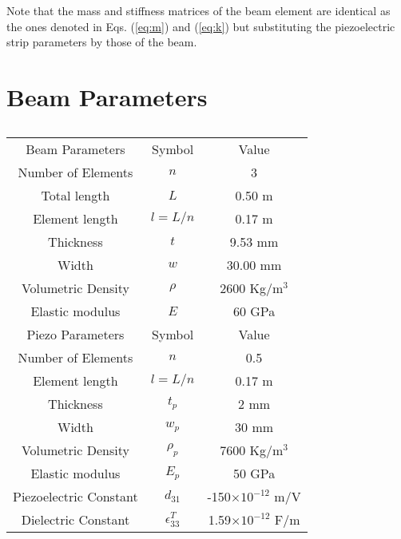 \documentclass{ifacconf}
\begin{document}
Note that the mass and stiffness matrices of the beam element are identical as the ones denoted in Eqs. (\ref{eq:m}) and (\ref{eq:k}) but substituting the piezoelectric strip parameters by those of the beam.


\section{Beam Parameters}              

\begin{table}[h!]
\caption{}
\begin{center}
\label{tab:parameters}
\begin{tabular}{c c c}
& & \\ \hline
\hline
Beam Parameters & Symbol & Value\\
\hline
Number of Elements & $n$ & 3 \\
Total length & $L$ & 0.50 m\\
Element length & $l=L/n$ & 0.17 m\\
Thickness & $t$ & 9.53 mm \\
Width & $w$ & 30.00 mm \\
Volumetric Density & $\rho$ & 2600 Kg/m$^3$ \\
Elastic modulus & $E$ & 60 GPa \\
\hline
\hline
Piezo Parameters & Symbol & Value\\
\hline
Number of Elements & $n$ & 0.5 \\
Element length & $l=L/n$ & 0.17 m\\
Thickness & $t_p$ & 2 mm \\
Width & $w_p$ & 30 mm \\
Volumetric Density & $\rho_p$ & 7600 Kg/m$^3$ \\
Elastic modulus & $E_p$ & 50 GPa \\
Piezoelectric Constant & $d_{31}$ & -150$\times 10^{-12}$ m/V \\
Dielectric Constant & $\epsilon_{33}^T$ & 1.59$\times 10^{-12}$ F/m \\
\hline
\hline
\end{tabular}
\end{center}
\end{table}       
                                                
\end{document}
